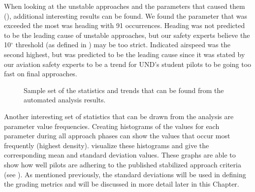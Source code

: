     When looking at the unstable approaches and the parameters that caused them (), additional interesting results can be found.  We found the parameter that was exceeded the most was heading with 91 occurrences.  Heading was not predicted to be the leading cause of unstable approaches, but our safety experts believe the 10$^\circ$ threshold (as defined in ) may be too strict.  Indicated airspeed was the second highest, but was predicted to be the leading cause since it was stated by our aviation safety experts to be a trend for UND's student pilots to be going too fast on final approaches.
    
    \begin{figure}
    	\centering
        \hfill%
        
        \hfill%
        \caption{Sample set of the statistics and trends that can be found from the automated analysis results.}
        \label{fig:example_statistics}
    \end{figure}
    
    
    Another interesting set of statistics that can be drawn from the analysis are parameter value frequencies.  Creating histograms of the values for each parameter during all approach phases can show the values that occur most frequently (highest density).   visualize these histograms and give the corresponding mean and standard deviation values.  These graphs are able to show how well pilots are adhering to the published stabilized approach criteria (see ).  As mentioned previously, the standard deviations will be used in defining the grading metrics and will be discussed in more detail later in this Chapter.
    
